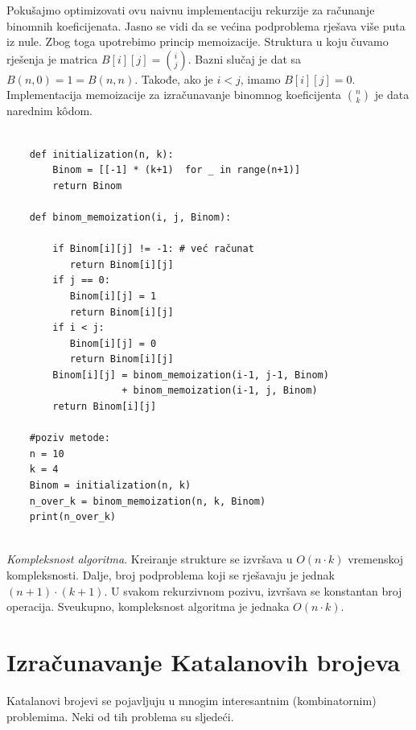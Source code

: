   Pokušajmo optimizovati ovu naivnu implementaciju rekurzije za računanje binomnih koeficijenata.  Jasno se vidi da se većina podproblema rješava više puta iz nule. Zbog toga upotrebimo princip memoizacije. Struktura u koju čuvamo rješenja je matrica $B[i][j]= \binom{i}{j}$. Bazni slučaj je  dat sa $B(n, 0) = 1 = B(n,n)$. Takođe, ako je $i < j$, imamo $B[i][j] = 0$. Implementacija memoizacije za izračunavanje binomnog koeficijenta $\binom{n}{k}$ je data narednim k\^odom. 
  
  \begin{verbatim}
  	
  	def initialization(n, k):
  	    Binom = [[-1] * (k+1)  for _ in range(n+1)] 
  	    return Binom 
  	    
  	def binom_memoization(i, j, Binom): 
  	    
  	    if Binom[i][j] != -1: # već računat
  	       return Binom[i][j] 
  	    if j == 0: 
  	       Binom[i][j] = 1
  	       return Binom[i][j] 
  	    if i < j: 
  	       Binom[i][j] = 0 
  	       return Binom[i][j]
  	    Binom[i][j] = binom_memoization(i-1, j-1, Binom) 
  	                + binom_memoization(i-1, j, Binom) 
  	    return Binom[i][j]

    #poziv metode:
    n = 10
    k = 4
    Binom = initialization(n, k) 
    n_over_k = binom_memoization(n, k, Binom) 
    print(n_over_k)
    
  \end{verbatim}  
  
  \textit{Kompleksnost algoritma}.  Kreiranje strukture se izvršava u $O(n\cdot k)$ vremenskoj kompleksnosti. Dalje,  broj podproblema koji se rješavaju je jednak $(n+1) \cdot (k+1)$.  U svakom rekurzivnom pozivu, izvršava se konstantan broj operacija. Sveukupno, kompleksnost algoritma je jednaka $O(n \cdot k)$. 
  
  
  
   
 \section{Izračunavanje Katalanovih brojeva}
 
 Katalanovi brojevi se pojavljuju u mnogim interesantnim (kombinatornim)
 problemima. Neki od tih problema su sljedeći. 
 
